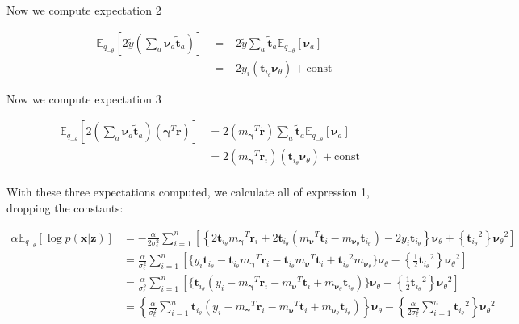 \documentclass[letterpaper,12pt]{article}
\newcommand{\lc}{\left \{} %
\newcommand{\rc}{\right \}} %
\newcommand{\lp}{\left (} %
\newcommand{\rp}{\right )} %
\newcommand{\lb}{\left [} %
\newcommand{\rb}{\right ]} %
\newcommand{\pxgivenz}{\ensuremath{p(\boldsymbol{x} | \boldsymbol{z})}}
\newcommand{\sigmaepsilon}{\sigma_\epsilon^2} %
\newcommand{\nuv}{\boldsymbol{\nu}} %
\newcommand{\gammav}{\boldsymbol{\gamma}} %
\newcommand{\ti}{\boldsymbol{t}_i} %
\newcommand{\ri}{\boldsymbol{r}_i} %
\newcommand{\ytilde}{\ensuremath{\tilde{y}}} %
\newcommand{\ttilde}{\ensuremath{\tilde{\boldsymbol{t}}}} %
\newcommand{\rtilde}{\ensuremath{\tilde{\boldsymbol{r}}}} %
\newcommand{\mnu}{\ensuremath{m_\nuv}} %
\newcommand{\mgamma}{m_\gammav} %
\newcommand{\nua}{\ensuremath{\nuv_a}} %
\newcommand{\tatilde}{\ensuremath{\ttilde_a}} %
\newcommand{\tthetatilde}{\ensuremath{\boldsymbol{t}_{i_\theta}}} %
\newcommand{\nutheta}{\ensuremath{\nuv_\theta}} %
\newcommand{\mnusub}[1]{\ensuremath{m_{\nuv_#1}}} %
\newcommand{\Etheta}{\ensuremath{\mathbb{E}_{q_{-\theta}}}} %
\newcommand{\el}{\left[} %
\newcommand{\er}{\right]} %
\begin{document}
Now we compute expectation 2

\begin{equation}
\begin{split}
    - \Etheta \lb 2 \ytilde \lp \sum_a \nua \tatilde \rp \rb &= -2 \ytilde \sum_a \tatilde \Etheta \lb \nua \rb \\
    &= -2 y_i \lp \tthetatilde \nutheta \rp + \text{const}
\end{split}
\end{equation}

Now we compute expectation 3

\begin{equation}
\begin{split}
    \Etheta \lb 2 \lp \sum_a \nua \tatilde \rp \lp \gammav^T \rtilde \rp \rb &= 2 \lp {\mgamma}^T \rtilde \rp \sum_a \tatilde \Etheta \lb \nua \rb \\
    &= 2 \lp {\mgamma}^T \ri \rp \lp \tthetatilde \nutheta \rp + \text{const} \\
\end{split}
\end{equation}

With these three expectations computed, we calculate all of expression 1, dropping the constants:

\begin{equation}
\begin{split}
    \alpha \Etheta \el \log \pxgivenz \er &= - \frac{\alpha}{2 \sigmaepsilon} \sum_{i=1}^n \lb \lc 2 \tthetatilde {\mgamma}^T \ri + 2 \tthetatilde \lp {\mnu}^T \ti - \mnusub{\theta} \ti_\theta \rp - 2 y_i \tthetatilde  \rc \nutheta + \lc \tthetatilde^2 \rc \nutheta^2  \rb \\
    &= \frac{\alpha}{ \sigmaepsilon} \sum_{i=1}^n \lb \bigg\{ y_i \tthetatilde - \tthetatilde {\mgamma}^T \ri - \tthetatilde {\mnu}^T \ti + \tthetatilde^2 \mnusub{\theta} \bigg\} \nutheta - \lc \frac{1}{2} \tthetatilde^2 \rc \nutheta^2  \rb \\
    &= \frac{\alpha}{ \sigmaepsilon} \sum_{i=1}^n \lb \bigg\{ \tthetatilde \lp y_i - {\mgamma}^T \ri - {\mnu}^T \ti + \mnusub{\theta} \tthetatilde \rp \bigg\} \nutheta - \lc \frac{1}{2} \tthetatilde^2 \rc \nutheta^2  \rb \\
    &= \lc  \frac{\alpha}{ \sigmaepsilon} \sum_{i=1}^n \tthetatilde \lp y_i - {\mgamma}^T \ri - {\mnu}^T \ti + \mnusub{\theta} \tthetatilde \rp \rc \nutheta - \lc \frac{\alpha}{2 \sigmaepsilon} \sum_{i=1}^n \tthetatilde^2 \rc \nutheta^2
\end{split}
\end{equation}
\end{document}
